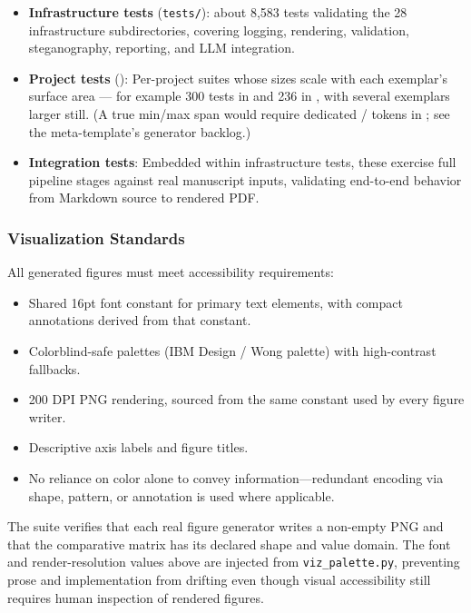 \documentclass[
  english,
]{article}
\providecommand{\tightlist}{%
  \setlength{\itemsep}{0pt}\setlength{\parskip}{0pt}}
\begin{document}
\begin{itemize}
\tightlist
\item
  \textbf{Infrastructure tests} (\texttt{tests/}): about 8,583
  tests validating the 28 infrastructure subdirectories, covering
  logging, rendering, validation, steganography, reporting, and LLM
  integration.
\item
  \textbf{Project tests} (): Per-project
  suites whose sizes scale with each exemplar's surface area --- for
  example 300 tests in  and 236
  in , with several exemplars larger
  still. (A true min/max span would require dedicated
  /
  tokens in ; see the
  meta-template's generator backlog.)
\item
  \textbf{Integration tests}: Embedded within infrastructure tests,
  these exercise full pipeline stages against real manuscript inputs,
  validating end-to-end behavior from Markdown source to rendered PDF.
\end{itemize}

\subsubsection{Visualization Standards}\label{visualization-standards}

All generated figures must meet accessibility requirements:

\begin{itemize}
\tightlist
\item
  Shared 16pt font constant for primary text elements, with compact
  annotations derived from that constant.
\item
  Colorblind-safe palettes (IBM Design / Wong palette) with
  high-contrast fallbacks.
\item
  200 DPI PNG rendering, sourced from the same constant used by every
  figure writer.
\item
  Descriptive axis labels and figure titles.
\item
  No reliance on color alone to convey information---redundant encoding
  via shape, pattern, or annotation is used where applicable.
\end{itemize}

The  suite verifies that each real
figure generator writes a non-empty PNG and that the comparative matrix
has its declared shape and value domain. The font and render-resolution
values above are injected from \texttt{viz\_palette.py}, preventing
prose and implementation from drifting even though visual accessibility
still requires human inspection of rendered figures.
\end{document}
